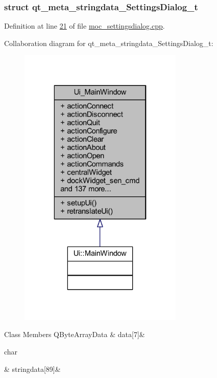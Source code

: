 \subsubsection{struct qt\+\_\+meta\+\_\+stringdata\+\_\+\+Settings\+Dialog\+\_\+t}


Definition at line \hyperlink{a00069_source_l00021}{21} of file \hyperlink{a00069_source}{moc\+\_\+settingsdialog.\+cpp}.



Collaboration diagram for qt\+\_\+meta\+\_\+stringdata\+\_\+\+Settings\+Dialog\+\_\+t\+:
\nopagebreak
\begin{figure}[H]
\begin{center}
\leavevmode
\includegraphics[width=222pt]{d0/d39/a00314}
\end{center}
\end{figure}
\begin{DoxyFields}{Class Members}
\hypertarget{a00069_a320edc752a589bd0171189d51579680e}{Q\+Byte\+Array\+Data}\label{a00069_a320edc752a589bd0171189d51579680e}
&
data\mbox{[}7\mbox{]}&
\\
\hline

\hypertarget{a00069_ab803985b8fecb8e67a35ab5a3939845b}{char}\label{a00069_ab803985b8fecb8e67a35ab5a3939845b}
&
stringdata\mbox{[}89\mbox{]}&
\\
\hline

\end{DoxyFields}


